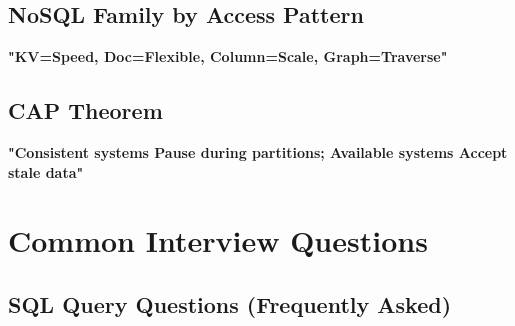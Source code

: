 \documentclass[11pt]{article}
\begin{document}
\subsection{NoSQL Family by Access Pattern}\label{nosql-family-by-access-pattern}

\textbf{"KV=Speed, Doc=Flexible, Column=Scale, Graph=Traverse"}

\subsection{CAP Theorem}\label{cap-theorem}

\textbf{"Consistent systems Pause during partitions; Available systems Accept stale data"}

\section{Common Interview Questions}\label{common-interview-questions}

\subsection{SQL Query Questions (Frequently Asked)}\label{sql-query-questions-frequently-asked}

\end{document}
